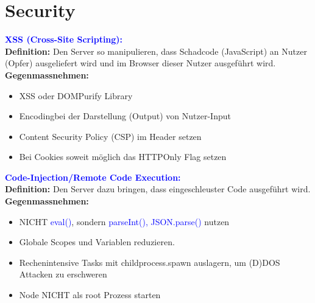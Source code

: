 
\section{Security}
\textbf{\textcolor{blue}{XSS (Cross-Site Scripting):}}\\
\textbf{Definition:} Den Server so manipulieren, dass Schadcode (JavaScript) an Nutzer (Opfer) ausgeliefert wird und im Browser dieser Nutzer ausgeführt wird.\\
\textbf{Gegenmassnehmen:}
\begin{itemize}[topsep=0pt, leftmargin=3mm]
    \setlength\itemsep{-0.3em}
    \item XSS oder DOMPurify Library
    \item \dq Encoding\dq bei der Darstellung (Output) von Nutzer-Input
    \item Content Security Policy (CSP) im Header setzen
    \item Bei Cookies soweit möglich das HTTPOnly Flag setzen
\end{itemize}
\textbf{\textcolor{blue}{Code-Injection/Remote Code Execution:}}\\
\textbf{Definition:} Den Server dazu bringen, dass eingeschleuster Code ausgeführt wird.\\
\textbf{Gegenmassnehmen:}
\begin{itemize}[topsep=0pt, leftmargin=3mm]
    \setlength\itemsep{-0.3em}
    \item NICHT \textcolor{blue}{eval()}, sondern \textcolor{blue}{parseInt(), JSON.parse()} nutzen
    \item Globale Scopes und Variablen reduzieren.
    \item Rechenintensive Tasks mit childprocess.spawn auslagern, um (D)DOS Attacken zu erschweren
    \item Node NICHT als root Prozess starten
\end{itemize}
